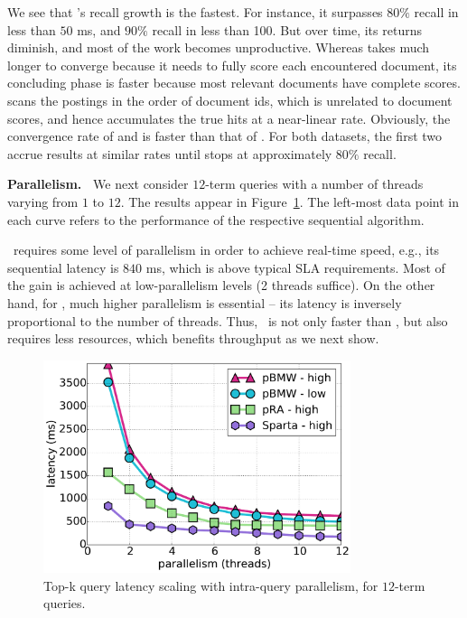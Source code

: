 We see that \alg's recall growth is the fastest. For instance, it surpasses $80\%$ recall in less than $50$ ms, 
and $90\%$ recall in less than 100. But over time, its returns  diminish, and most of the work becomes unproductive. Whereas
\pRA\/ takes much longer to converge because it needs to fully score each encountered document,  its concluding phase is faster because 
most relevant documents   have complete  scores. 
\pBMW\/ scans the postings in the order of document ids, which is unrelated to document scores, and hence accumulates the true hits 
at a near-linear rate. Obviously, the convergence rate of \pBMW\hi\/ and \pBMW\lo\/ is faster than that of \pBMW\ex. For both datasets, the first 
two accrue results at similar rates until \pBMW\lo\/ stops at approximately $80\%$ recall. 

{\bf Parallelism.\ } 
We next consider  $12$-term queries with a number of threads varying from $1$ to $12$. 
The results appear in Figure~\ref{fig:threads-scaling}.  The left-most data point in each curve refers to the performance of 
the respective sequential algorithm.

\alg\ requires some level of parallelism in order to achieve real-time speed, e.g., its sequential
latency is $840$ ms, which is  above typical SLA requirements. Most of the gain is achieved at low-parallelism levels (2 threads suffice). 
On the other hand, for \pBMW, much higher parallelism is essential -- its latency is inversely proportional to the number of threads. Thus, \alg\ is not only faster 
than \pBMW, but also requires less resources, which benefits throughput as we next show.

\begin{figure}[tbh]
\centering
\includegraphics[width=9cm]{figures/latency_12terms_clueweb.pdf}
\caption{Top-k query latency scaling with intra-query parallelism, for $12$-term queries.}
\label{fig:threads-scaling}
\end{figure}


